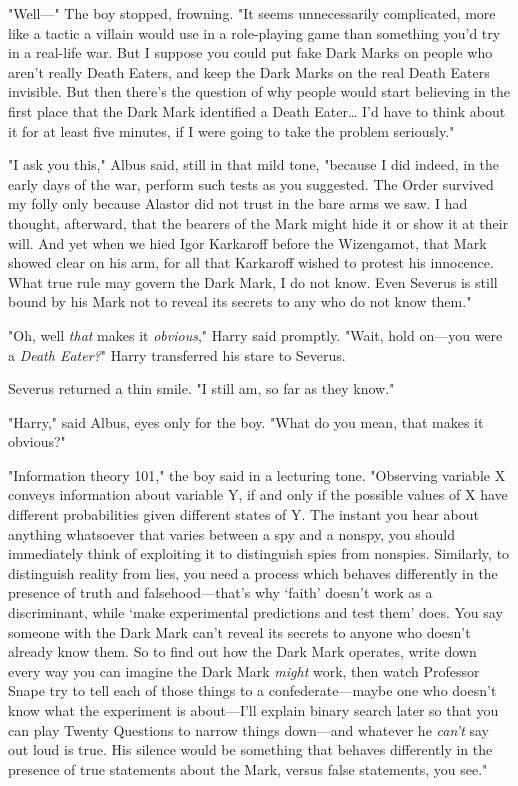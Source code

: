 "Well---" The boy stopped, frowning. "It seems unnecessarily complicated, more 
like a tactic a villain would use in a role-playing game than something you'd 
try in a real-life war. But I suppose you could put fake Dark Marks on people 
who aren't really Death Eaters, and keep the Dark Marks on the real Death 
Eaters invisible. But then there's the question of why people would start 
believing in the first place that the Dark Mark identified a Death 
Eater{\ldots} I'd have to think about it for at least five minutes, if I were 
going to take the problem seriously."

"I ask you this," Albus said, still in that mild tone, "because I did indeed, 
in the early days of the war, perform such tests as you suggested. The Order 
survived my folly only because Alastor did not trust in the bare arms we saw. I 
had thought, afterward, that the bearers of the Mark might hide it or show it 
at their will. And yet when we hied Igor Karkaroff before the Wizengamot, that 
Mark showed clear on his arm, for all that Karkaroff wished to protest his 
innocence. What true rule may govern the Dark Mark, I do not know. Even Severus 
is still bound by his Mark not to reveal its secrets to any who do not know 
them."

"Oh, well \emph{that} makes it \emph{obvious}," Harry said promptly. "Wait, 
hold on---you were a \emph{Death Eater?}" Harry transferred his stare to 
Severus.

Severus returned a thin smile. "I still am, so far as they know."

"Harry," said Albus, eyes only for the boy. "What do you mean, that makes it 
obvious?"

"Information theory 101," the boy said in a lecturing tone. "Observing variable 
X conveys information about variable Y, if and only if the possible values of X 
have different probabilities given different states of Y. The instant you hear 
about anything whatsoever that varies between a spy and a nonspy, you should 
immediately think of exploiting it to distinguish spies from nonspies. 
Similarly, to distinguish reality from lies, you need a process which behaves 
differently in the presence of truth and falsehood---that's why `faith' doesn't 
work as a discriminant, while `make experimental predictions and test them' 
does. You say someone with the Dark Mark can't reveal its secrets to anyone who 
doesn't already know them. So to find out how the Dark Mark operates, write 
down every way you can imagine the Dark Mark \emph{might} work, then watch 
Professor Snape try to tell each of those things to a confederate---maybe one 
who doesn't know what the experiment is about---I'll explain binary search 
later so that you can play Twenty Questions to narrow things down---and 
whatever he \emph{can't} say out loud is true. His silence would be something 
that behaves differently in the presence of true statements about the Mark, 
versus false statements, you see."

